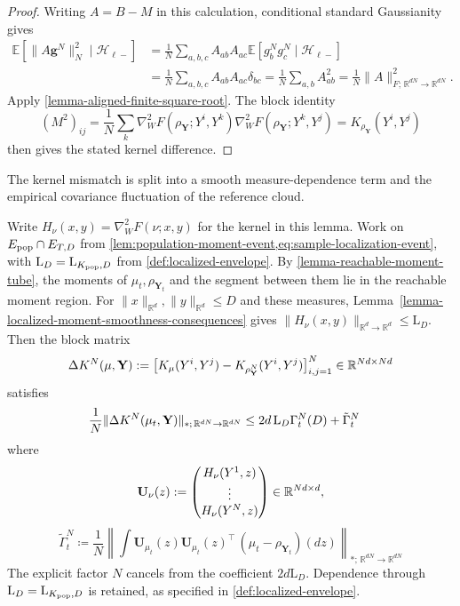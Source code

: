\begin{proof}
Writing $A=B-M$ in this calculation, conditional standard Gaussianity gives
\[
\begin{aligned}
 \mathbb E[\|A\mathbf g^N\|_N^2\mid\mathcal H_{\ell-}]
 &=\frac1N\sum_{a,b,c}A_{ab}A_{ac}
       \mathbb E[g_b^Ng_c^N\mid\mathcal H_{\ell-}]\\
 &=\frac1N\sum_{a,b,c}A_{ab}A_{ac}\delta_{bc}
 =\frac1N\sum_{a,b}A_{ab}^2=\frac1N\|A\|_{F;\,\mathbb R^{dN}\to\mathbb R^{dN}}^2.
\end{aligned}
\]
Apply \cref{lemma-aligned-finite-square-root}. The block identity
\[
 (M^2)_{ij}=\frac1N\sum_k\nabla_W^2F(\rho_{\mathbf Y};Y^i,Y^k)
 \nabla_W^2F(\rho_{\mathbf Y};Y^k,Y^j)
 =K_{\rho_{\mathbf Y}}(Y^i,Y^j)
\]
then gives the stated kernel difference.
\end{proof}

The kernel mismatch is split into a smooth measure-dependence term and the
empirical covariance fluctuation of the reference cloud.

\begin{lemma}
\label{lemma-kernel-mismatch-bound}
Write $H_\nu(x,y)=\nabla_W^2F(\nu;x,y)$ for the kernel in this lemma.
Work on $E_{\rm pop}\cap E_{T,D}$ from
\cref{lem:population-moment-event,eq:sample-localization-event}, with
$\mathrm L_D=\mathrm L_{K_{\rm pop},D}$ from \cref{def:localized-envelope}.
By \cref{lemma-reachable-moment-tube}, the moments of $\mu_t,\rho_{\mathbf Y_t}$ and the segment between them lie in the
reachable moment region. For $\|x\|_{\mathbb R^d},\|y\|_{\mathbb R^d}\le D$ and these measures,
Lemma~\ref{lemma-localized-moment-smoothness-consequences} gives
$\|H_\nu(x,y)\|_{\mathbb R^d\to\mathbb R^d}\le \mathrm L_D$. Then the block matrix
\[
\Delta K^N(\mu,\mathbf Y)
:=
\bigl[
K_\mu(Y^i,Y^j)-K_{\rho_{\mathbf Y}^N}(Y^i,Y^j)
\bigr]_{i,j=1}^N
\in\mathbb{R}^{Nd\times Nd}
\]
satisfies
\begin{align}
\frac1N\|\Delta K^N(\mu_t,\mathbf Y)\|_{*;\,\mathbb R^{dN}\to\mathbb R^{dN}}
\le{}&
2d\,\mathrm L_D\Gamma_t^N(D)+\tilde{\Gamma}_t^N
\label{eq:kernel-matrix-bound-good}
\notag
\end{align}
where
\[
\mathbf U_\nu(z)
:=
\begin{pmatrix}
H_\nu(Y^1,z)\\
\vdots\\
H_\nu(Y^N,z)
\end{pmatrix}
\in\mathbb{R}^{Nd\times d},
\]
\[
\tilde{\Gamma}_t^N\coloneq 
\frac1N\left\|
\int \mathbf U_{\mu_t}(z)\mathbf U_{\mu_t}(z)^\top\,
(\mu_t-\rho_{\mathbf Y_t})(dz)
\right\|_{*;\,\mathbb R^{dN}\to\mathbb R^{dN}}
\]
The explicit factor $N$ cancels from the coefficient $2d\mathrm L_D$.
Dependence through $\mathrm L_D=\mathrm L_{K_{\rm pop},D}$ is retained,
as specified in \cref{def:localized-envelope}.
\end{lemma}

